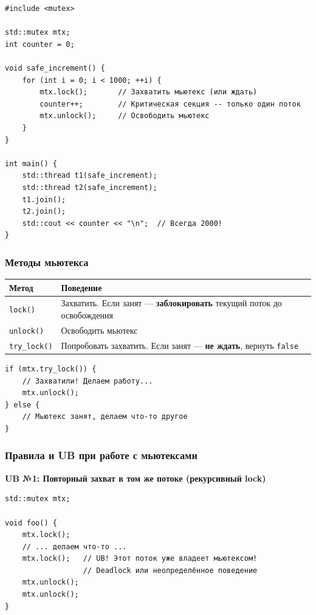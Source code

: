 \documentclass[a4paper,12pt]{article}
\begin{document}
\begin{lstlisting}
#include <mutex>

std::mutex mtx;
int counter = 0;

void safe_increment() {
    for (int i = 0; i < 1000; ++i) {
        mtx.lock();       // Захватить мьютекс (или ждать)
        counter++;        // Критическая секция -- только один поток
        mtx.unlock();     // Освободить мьютекс
    }
}

int main() {
    std::thread t1(safe_increment);
    std::thread t2(safe_increment);
    t1.join();
    t2.join();
    std::cout << counter << "\n";  // Всегда 2000!
}
\end{lstlisting}

\subsubsection{Методы мьютекса}

\begin{center}
\begin{tabular}{lp{9cm}}
\toprule
\textbf{Метод} & \textbf{Поведение} \\
\midrule
\texttt{lock()}
    & Захватить. Если занят --- \textbf{заблокировать} текущий поток до освобождения \\
\addlinespace
\texttt{unlock()}
    & Освободить мьютекс \\
\addlinespace
\texttt{try\_lock()}
    & Попробовать захватить. Если занят --- \textbf{не ждать}, вернуть \texttt{false} \\
\bottomrule
\end{tabular}
\end{center}

\begin{lstlisting}
if (mtx.try_lock()) {
    // Захватили! Делаем работу...
    mtx.unlock();
} else {
    // Мьютекс занят, делаем что-то другое
}
\end{lstlisting}

\subsubsection{Правила и UB при работе с мьютексами}

\textbf{UB №1: Повторный захват в том же потоке (рекурсивный lock)}

\begin{lstlisting}
std::mutex mtx;

void foo() {
    mtx.lock();
    // ... делаем что-то ...
    mtx.lock();   // UB! Этот поток уже владеет мьютексом!
                  // Deadlock или неопределённое поведение
    mtx.unlock();
    mtx.unlock();
}
\end{lstlisting}
\end{document}
